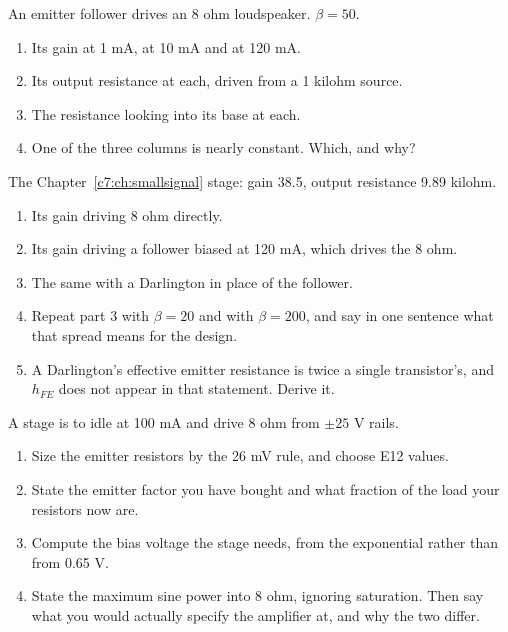 \label{c8:ex:3}
An emitter follower drives an 8 ohm loudspeaker. $\beta = 50$.

\begin{enumerate}
  \item Its gain at 1 mA, at 10 mA and at 120 mA.
  \item Its output resistance at each, driven from a 1 kilohm source.
  \item The resistance looking into its base at each.
  \item One of the three columns is nearly constant. Which, and why?
\end{enumerate}

\label{c8:ex:4}
The Chapter~\ref{c7:ch:smallsignal} stage: gain 38.5, output resistance 9.89 kilohm.

\begin{enumerate}
  \item Its gain driving 8 ohm directly.
  \item Its gain driving a follower biased at 120 mA, which drives the 8 ohm.
  \item The same with a Darlington in place of the follower.
  \item Repeat part 3 with $\beta = 20$ and with $\beta = 200$, and say in one sentence what that spread means for the design.
  \item A Darlington's effective emitter resistance is twice a single transistor's, and $h_{FE}$ does not appear in that statement. Derive it.
\end{enumerate}

\label{c8:ex:5}
A stage is to idle at 100 mA and drive 8 ohm from $\pm 25$ V rails.

\begin{enumerate}
  \item Size the emitter resistors by the 26 mV rule, and choose E12 values.
  \item State the emitter factor you have bought and what fraction of the load your resistors now are.
  \item Compute the bias voltage the stage needs, from the exponential rather than from 0.65 V.
  \item State the maximum sine power into 8 ohm, ignoring saturation. Then say what you would actually specify the amplifier at, and why the two differ.
\end{enumerate}


